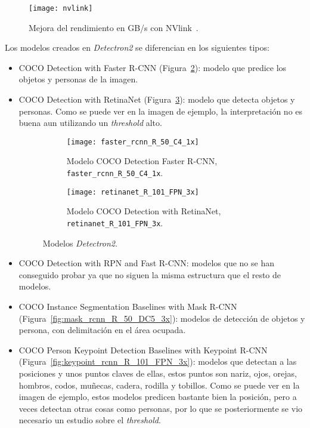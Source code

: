 {\begin{figure}[h]
	\centering
	\texttt{[image: nvlink]}
	\caption[Mejora del rendimiento en GB/s con NVlink.]{Mejora del rendimiento en GB/s con NVlink~\cite{nvlink}.}
	\label{fig:nvlink}
\end{figure}

Los modelos creados en \textit{Detectron2} se diferencian en los siguientes tipos:
\begin{itemize}
	\item COCO Detection with Faster R-CNN (Figura~\ref{fig:faster_rcnn_R_50_C4_1x}): modelo que predice los objetos y personas de la imagen.

	\item COCO Detection with RetinaNet (Figura~\ref{fig:retinanet_R_101_FPN_3x}): modelo que detecta objetos y personas. Como se puede ver en la imagen de ejemplo, la interpretación no es buena aun utilizando un \textit{threshold} alto.

	\begin{figure}[ht]
		\begin{subfigure}{.48\textwidth}
			\centering
			\texttt{[image: faster\_rcnn\_R\_50\_C4\_1x]}
			\caption{Modelo COCO Detection Faster R-CNN, \texttt{faster\_rcnn\_R\_50\_C4\_1x}.}
			\label{fig:faster_rcnn_R_50_C4_1x}
		\end{subfigure}
		\begin{subfigure}{.48\textwidth}
			\centering
			\texttt{[image: retinanet\_R\_101\_FPN\_3x]}
			\caption{Modelo COCO Detection with RetinaNet, \texttt{retinanet\_R\_101\_FPN\_3x}.}
			\label{fig:retinanet_R_101_FPN_3x}
		\end{subfigure}
		\caption{Modelos \textit{Detectron2}.}
		\label{fig:m1}
	\end{figure}
	\item COCO Detection with RPN and Fast R-CNN: modelos que no se han conseguido probar ya que no siguen la misma estructura que el resto de modelos.
	\item COCO Instance Segmentation Baselines with Mask R-CNN (Figura~\ref{fig:mask_rcnn_R_50_DC5_3x}): modelos de detección de objetos y persona, con delimitación en el área ocupada.

	\item COCO Person Keypoint Detection Baselines with Keypoint R-CNN (Figura~\ref{fig:keypoint_rcnn_R_101_FPN_3x}): modelos que detectan a las posiciones y unos puntos claves de ellas, estos puntos son nariz, ojos, orejas, hombros, codos, muñecas, cadera, rodilla y tobillos. Como se puede ver en la imagen de ejemplo, estos modelos predicen bastante bien la posición, pero a veces detectan otras cosas como personas, por lo que se posteriormente se vio necesario un estudio sobre el \textit{threshold}.


\end{itemize}}
